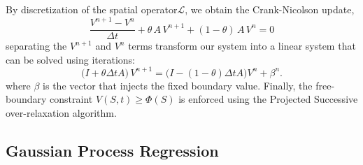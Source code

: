 \documentclass[%
 reprint,
 superscriptaddress,
nobibnotes,
 amsmath,amssymb,
 aps,
]{revtex4-2}
\begin{document}
By discretization of the spatial operator$\mathcal{L}$, we obtain the Crank-Nicolson update,
\begin{equation}
    \frac{V^{n+1}-V^n}{\Delta t} + \theta\,A\,V^{n+1} + (1-\theta)\,A\,V^n = 0 
\end{equation}
separating the $V^{n+1}$ and $V^{n}$ terms transform our system into a linear system that can be solved using iterations:
\begin{equation}
    \bigl(I + \theta\Delta t A\bigr)\,V^{n+1} = \bigl(I - (1-\theta)\Delta t A\bigr)V^n +\beta^n.
\end{equation}
where $\beta$ is the vector that injects the fixed boundary value. Finally, the free-boundary constraint $V(S,t)\geq\Phi(S)$ is enforced using the Projected Successive over-relaxation algorithm\cite{ikonen2004operator, ikonen2008efficient}.


\subsection{Gaussian Process Regression}
\end{document}

